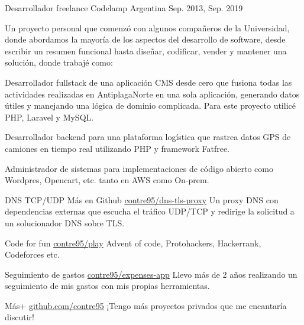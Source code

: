 \hypersetup{colorlinks}
\begin{cventries}

	\cventry
	{Desarrollador freelance} %
	{Codelamp} %
	{Argentina} %
	{Sep. 2013, Sep. 2019} %
	{
		{Un proyecto personal que comenzó con algunos compañeros de la Universidad, donde abordamos la mayoría de los aspectos del desarrollo de software, desde escribir un resumen funcional hasta diseñar, codificar, vender y mantener una solución, donde trabajé como:}
		\linebreak
		\begin{cvitems}
			\item {Desarrollador fullstack de una aplicación CMS desde cero que fusiona todas las actividades realizadas en AntiplagaNorte en una sola aplicación, generando datos útiles y manejando una lógica de dominio complicada. Para este proyecto utilicé PHP, Laravel y MySQL.}
            \item {Desarrollador backend para una plataforma logística que rastrea datos GPS de camiones en tiempo real utilizando PHP y framework Fatfree.}
			\item {Administrador de sistemas para implementaciones de código abierto como Wordpres, Opencart, etc. tanto en AWS como On-prem.}
		\end{cvitems}
	}


	\cventry
	{DNS TCP/UDP } %
	{Más en Github} %
	{} %
    {\href{https://github.com/contre95/dns-tls-proxy}{\url{contre95/dns-tls-proxy}}}
    {Un proxy DNS con dependencias externas que escucha el tráfico UDP/TCP y redirige la solicitud a un solucionador DNS sobre TLS.}

	\cventry
	{Code for fun} %
	{} %
	{} %
	{\href{https://github.com/contre95/play}{\url{contre95/play}}} %
    {Advent of code, Protohackers, Hackerrank, Codeforces etc. }

	\cventry
	{Seguimiento de gastos} %
	{} %
	{} %
	{\href{https://github.com/contre95/expenses-app}{\url{contre95/expenses-app}}} %
    {Llevo más de 2 años realizando un seguimiento de mis gastos con mis propias herramientas.}

	\cventry
	{Más+} %
	{} %
	{} %
	{\href{http://github.com/contre95}{\url{github.com/contre95}}} %
    {¡Tengo más proyectos privados que me encantaría discutir!}

\end{cventries}
